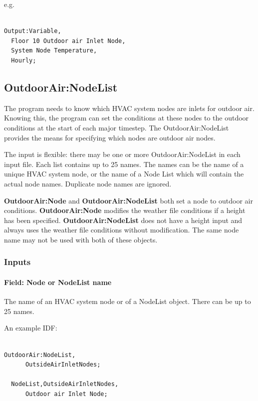 e.g.

\begin{lstlisting}

Output:Variable,
  Floor 10 Outdoor air Inlet Node,
  System Node Temperature,
  Hourly;
\end{lstlisting}

\subsection{OutdoorAir:NodeList}\label{outdoorairnodelist}

The program needs to know which HVAC system nodes are inlets for outdoor air. Knowing this, the program can set the conditions at these nodes to the outdoor conditions at the start of each major timestep. The OutdoorAir:NodeList provides the means for specifying which nodes are outdoor air nodes.

The input is flexible: there may be one or more OutdoorAir:NodeList in each input file. Each list contains up to 25 names. The names can be the name of a unique HVAC system node, or the name of a Node List which will contain the actual node names. Duplicate node names are ignored.

\textbf{OutdoorAir:Node} and \textbf{OutdoorAir:NodeList} both set a node to outdoor air conditions. \textbf{OutdoorAir:Node} modifies the weather file conditions if a height has been specified. \textbf{OutdoorAir:NodeList} does not have a height input and always uses the weather file conditions without modification. The same node name may not be used with both of these objects.

\subsubsection{Inputs}\label{inputs-6-001}

\paragraph{Field: Node or NodeList name}\label{field-node-or-nodelist-name}

The name of an HVAC system node or of a NodeList object. There can be up to 25 names.

An example IDF:

\begin{lstlisting}

OutdoorAir:NodeList,
      OutsideAirInletNodes;

  NodeList,OutsideAirInletNodes,
      Outdoor air Inlet Node;
\end{lstlisting}

